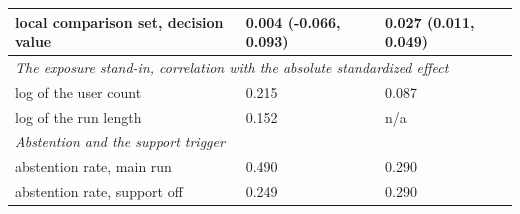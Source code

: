 \begin{tabular}{lll}
local comparison set, decision value & 0.004 (-0.066, 0.093) & 0.027 (0.011, 0.049) \\
\midrule
\multicolumn{3}{l}{\emph{The exposure stand-in, correlation with the absolute standardized effect}} \\
log of the user count & 0.215 & 0.087 \\
log of the run length & 0.152 & n/a \\
\midrule
\multicolumn{3}{l}{\emph{Abstention and the support trigger}} \\
abstention rate, main run & 0.490 & 0.290 \\
abstention rate, support off & 0.249 & 0.290 \\

\end{tabular}
